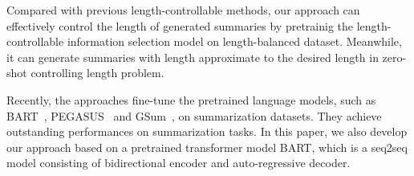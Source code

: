 Compared with previous length-controllable methods, 
our approach can effectively control the length of generated summaries
by pretrainig the length-controllable information selection model on length-balanced dataset. 
Meanwhile, it can generate summaries with length approximate
to the desired length in zero-shot controlling length problem. 

Recently, the approaches fine-tune the pretrained language models, such as BART~\cite{BART19}, PEGASUS~\cite{PEGASUS20} and GSum~\cite{GSum21},  on summarization datasets. They achieve outstanding performances on summarization tasks. In this paper, we also develop our approach based on a pretrained transformer model BART, which is a seq2seq model consisting of bidirectional encoder and auto-regressive decoder.

%




